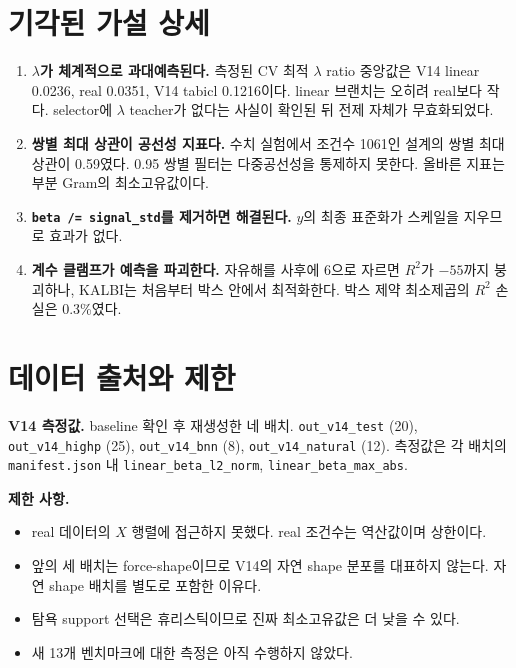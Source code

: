 \documentclass[11pt,a4paper]{article}
\theoremstyle{definition}
\begin{document}
\section{기각된 가설 상세}

\begin{enumerate}[label=(\arabic*),leftmargin=2.2em,itemsep=0.35em]
\item \textbf{\(\lambda\)가 체계적으로 과대예측된다.} 측정된 CV 최적 \(\lambda\) ratio 중앙값은 V14 linear 0.0236, real 0.0351, V14 tabicl 0.1216이다. linear 브랜치는 오히려 real보다 작다. selector에 \(\lambda\) teacher가 없다는 사실이 확인된 뒤 전제 자체가 무효화되었다.
\item \textbf{쌍별 최대 상관이 공선성 지표다.} 수치 실험에서 조건수 1061인 설계의 쌍별 최대 상관이 0.59였다. 0.95 쌍별 필터는 다중공선성을 통제하지 못한다. 올바른 지표는 부분 Gram의 최소고유값이다.
\item \textbf{\texttt{beta /= signal\_std}를 제거하면 해결된다.} \(y\)의 최종 표준화가 스케일을 지우므로 효과가 없다.
\item \textbf{계수 클램프가 예측을 파괴한다.} 자유해를 사후에 6으로 자르면 \(R^2\)가 \(-55\)까지 붕괴하나, KALBI는 처음부터 박스 안에서 최적화한다. 박스 제약 최소제곱의 \(R^2\) 손실은 0.3\%였다.
\end{enumerate}

\section{데이터 출처와 제한}

\textbf{V14 측정값.} baseline 확인 후 재생성한 네 배치. \verb|out_v14_test| (20), \verb|out_v14_highp| (25), \verb|out_v14_bnn| (8), \verb|out_v14_natural| (12). 측정값은 각 배치의 \verb|manifest.json| 내 \verb|linear_beta_l2_norm|, \verb|linear_beta_max_abs|.

\textbf{제한 사항.}
\begin{itemize}[leftmargin=1.6em,itemsep=0.25em]
\item real 데이터의 \(X\) 행렬에 접근하지 못했다. real 조건수는 역산값이며 상한이다.
\item 앞의 세 배치는 force-shape이므로 V14의 자연 shape 분포를 대표하지 않는다. 자연 shape 배치를 별도로 포함한 이유다.
\item 탐욕 support 선택은 휴리스틱이므로 진짜 최소고유값은 더 낮을 수 있다.
\item 새 13개 벤치마크에 대한 측정은 아직 수행하지 않았다.
\end{itemize}
\end{document}
